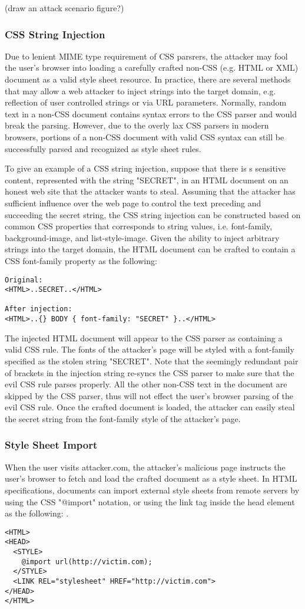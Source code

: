 \documentclass{acm_proc_article-sp}
\begin{document}
(draw an attack scenario figure?)

\subsubsection{CSS String Injection}
Due to lenient MIME type requirement of CSS parsrers, the attacker may fool the user's browser into loading a carefully crafted non-CSS (e.g. HTML or XML) document as a valid style sheet resource. In practice, there are several methods that may allow a web attacker to inject strings into the target domain, e.g. reflection of user controlled strings or via URL parameters. Normally, random text in a non-CSS document contains syntax errors to the CSS parser and would break the parsing. However, due to the overly lax CSS parsers in modern browsers, portions of a non-CSS document with valid CSS syntax can still be successfully parsed and recognized as style sheet rules.

To give an example of a CSS string injection, suppose that there is s sensitive content, represented with the string "SECRET", in an HTML document on an honest web site that the attacker wants to steal. Assuming that the attacker has sufficient influence over the web page to control the text preceding and succeeding the secret string, the CSS string injection can be constructed based on common CSS properties that corresponds to string values, i.e. font-family, background-image, and list-style-image. Given the ability to inject arbitrary strings into the target domain, the HTML document can be crafted to contain a CSS font-family property as the following:
\begin{verbatim}
Original:
<HTML>..SECRET..</HTML>

After injection:
<HTML>..{} BODY { font-family: "SECRET" }..</HTML>
\end{verbatim}
The injected HTML document will appear to the CSS parser as containing a valid CSS rule. The fonts of the attacker's page will be styled with a font-family specified as the stolen string "SECRET". Note that the seemingly redundant pair of brackets in the injection string re-syncs the CSS parser to make sure that the evil CSS rule parses properly. All the other non-CSS text in the document are skipped by the CSS parser, thus will not effect the user's browser parsing of the evil CSS rule. Once the crafted document is loaded, the attacker can easily steal the secret string from the font-family style of the attacker's page.

\subsubsection{Style Sheet Import}
When the user visits attacker.com, the attacker's malicious page instructs the user's browser to fetch and load the crafted document as a style sheet. In HTML specifications\cite{html}, documents can import external style sheets from remote servers by using the CSS "@import" notation, or using the link tag inside the head element as the following: .
\begin{verbatim}
<HTML>
<HEAD>
  <STYLE>
    @import url(http://victim.com);
  </STYLE>
  <LINK REL="stylesheet" HREF="http://victim.com">
</HEAD>
</HTML>
\end{verbatim}
\end{document}
